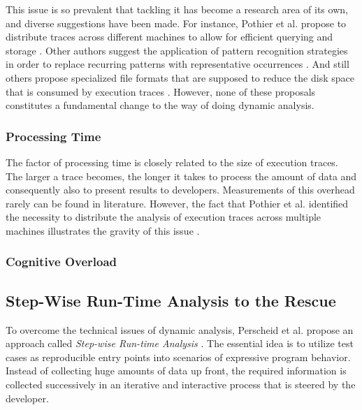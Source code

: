 This issue is so prevalent that tackling it has become a research area of its own, and diverse suggestions have been made.
For instance, Pothier et al. propose to distribute traces across different machines to allow for efficient querying and storage \cite{pothier_scalable_2007}.
Other authors suggest the application of pattern recognition strategies in order to  replace recurring patterns with representative occurrences \cite{de_pauw_execution_1998, systa_shimba_2001, richner_using_2002}.
And still others propose specialized file formats that are supposed to reduce the disk space that is consumed by execution traces \cite{johnson_lossless_1994, milenkovic_exploiting_2003}.
However, none of these proposals constitutes a fundamental change to the way of doing dynamic analysis.

\subsubsection{Processing Time}
The factor of processing time is closely related to the size of execution traces.
The larger a trace becomes, the longer it takes to process the amount of data and consequently also to present results to developers.
Measurements of this overhead rarely can be found in literature.
However, the fact that Pothier et al. identified the necessity to distribute the analysis of execution traces across multiple machines illustrates the gravity of this issue \cite{pothier_scalable_2007}.

\subsubsection{Cognitive Overload}

\subsection{Step-Wise Run-Time Analysis to the Rescue}
\label{ss:BackgroundTracing}
To overcome the technical issues of dynamic analysis, Perscheid et al. propose an approach called \emph{Step-wise Run-time Analysis} \citep{perscheid_immediacy_2010, perscheid_test-driven_2013}.
The essential idea is to utilize test cases as reproducible entry points into scenarios of expressive program behavior.
Instead of collecting huge amounts of data up front, the required information is collected successively in an iterative and interactive process that is steered by the developer.

